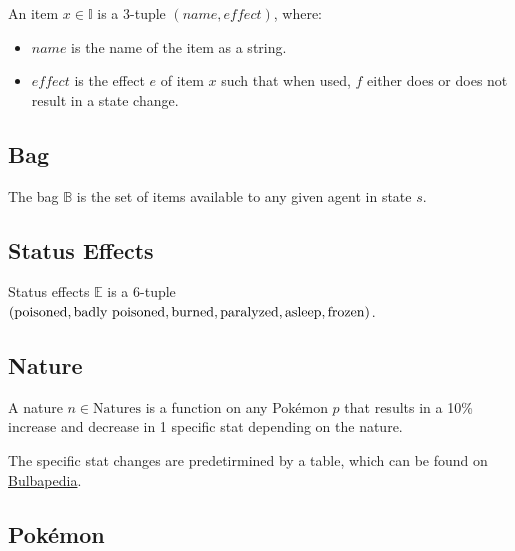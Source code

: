 An item $x \in \mathbb{I}$ is a 3-tuple $(name, effect)$, where:
\begin{itemize}
    \item $name$ is the name of the item as a string.
    \item $effect$ is the effect $e$ of item $x$ such that when used, $f$ either does or does not result in a state change.
\end{itemize}

\subsection{Bag}

The bag $\mathbb{B}$ is the set of items available to any given agent in state $s$.

\subsection{Status Effects}

Status effects $\mathbb{E}$ is a 6-tuple $( \text{poisoned}, \text{badly poisoned}, \text{burned}, \break \text{paralyzed}, \text{asleep}, \text{frozen} )$.

\subsection{Nature}

A nature $n \in \text{Natures}$ is a function on any Pokémon $p$ that results in a 10\% increase and decrease in 1 specific stat depending on the nature.

The specific stat changes are predetirmined by a table, which can be found on \href{https://bulbapedia.bulbagarden.net/wiki/Nature#Stat-focused_table}{Bulbapedia}.

\subsection{Pokémon}

